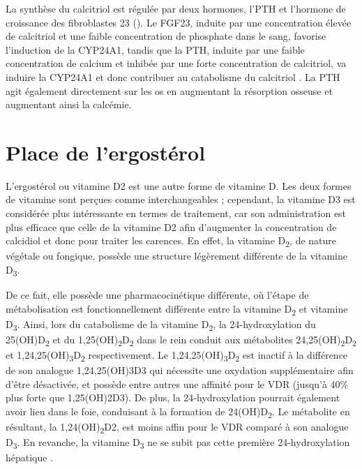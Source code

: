 \documentclass[
  a4paper,
  DIV=11,
  numbers=noendperiod,
  listof=totoc]{scrreprt}
\begin{document}
La synthèse du calcitriol est régulée par deux hormones, l'\acf{PTH} et
l'hormone de croissance des fibroblastes 23 (). Le
\ac{FGF23}, induite par une concentration élevée de calcitriol et une
faible concentration de phosphate dans le sang, favorise l'induction de
la \ac{CYP24A1}, tandis que la \ac{PTH}, induite par une faible
concentration de calcium et inhibée par une forte concentration de
calcitriol, va induire la \ac{CYP24A1} et donc contribuer au catabolisme
du calcitriol \autocite{Dankers.2017,Christakos.2010}. La \ac{PTH} agit
également directement sur les os en augmentant la résorption osseuse et
augmentant ainsi la calcémie.

\hypertarget{place-de-lergostuxe9rol}{%
\section{Place de l'ergostérol}\label{place-de-lergostuxe9rol}}

L'ergostérol ou vitamine D2 est une autre forme de vitamine D. Les deux
formes de vitamine sont perçues comme interchangeables ; cependant, la
vitamine D3 est considérée plus intéressante en termes de traitement,
car son administration est plus efficace que celle de la vitamine D2
afin d'augmenter la concentration de calcidiol et donc pour traiter les
carences. En effet, la vitamine D\textsubscript{2}, de nature végétale
ou fongique, possède une structure légèrement différente de la vitamine
D\textsubscript{3}.

De ce fait, elle possède une pharmacocinétique différente, où l'étape de
métabolisation est fonctionnellement différente entre la vitamine
D\textsubscript{2} et vitamine D\textsubscript{3}. Ainsi, lors du
catabolisme de la vitamine D\textsubscript{2}, la 24-hydroxylation du
25(OH)D\textsubscript{2} et du
1,25(OH)\textsubscript{2}D\textsubscript{2} dans le rein conduit aux
métabolites 24,25(OH)\textsubscript{2}D\textsubscript{2} et
1,24,25(OH)\textsubscript{3}D\textsubscript{2} respectivement. Le
1,24,25(OH)\textsubscript{3}D\textsubscript{2} est inactif à la
différence de son analogue \ac{1,24,25(OH)3D3} qui nécessite une
oxydation supplémentaire afin d'être désactivée, et possède entre autres
une affinité pour le \ac{VDR} (jusqu'à 40\% plus forte que
\ac{1,25(OH)2D3}). De plus, la 24-hydroxylation pourrait également avoir
lieu dans le foie, conduisant à la formation de
24(OH)D\textsubscript{2}. Le métabolite en résultant, la
1,24(OH)\textsubscript{2}D2, est moins affin pour le \ac{VDR} comparé à
son analogue D\textsubscript{3}. En revanche, la vitamine
D\textsubscript{3} ne se subit pas cette première 24-hydroxylation
hépatique \autocite{Houghton.2006}.
\end{document}
